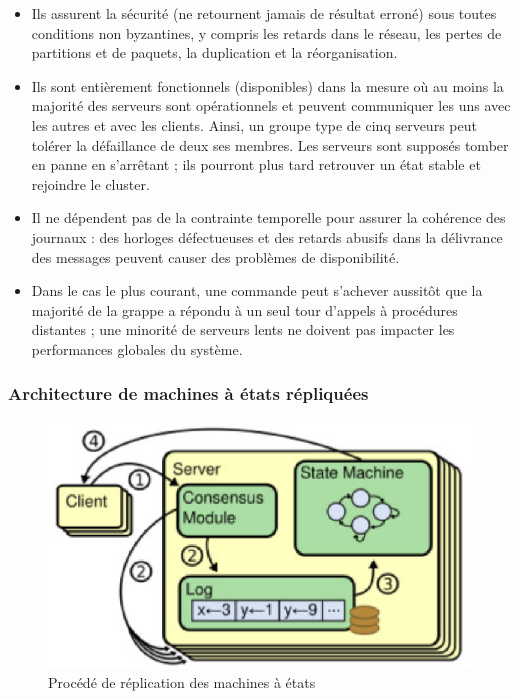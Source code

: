 \begin{itemize}
    \item Ils assurent la sécurité (ne retournent jamais de résultat erroné)
        sous toutes conditions non byzantines, y compris les retards dans le
        réseau, les pertes de partitions et de paquets, la duplication et
        la réorganisation.
    \item Ils sont entièrement fonctionnels (disponibles) dans la mesure où au
        moins la majorité des serveurs sont opérationnels et peuvent communiquer
        les uns avec les autres et avec les clients. Ainsi, un groupe type de
        cinq serveurs peut tolérer la défaillance de deux ses membres. Les
        serveurs sont supposés tomber en panne en s'arrêtant ; ils pourront plus
        tard retrouver un état stable et rejoindre le cluster.
    \item Il ne dépendent pas de la contrainte temporelle pour assurer la
        cohérence des journaux : des horloges défectueuses et des retards
        abusifs dans la délivrance des messages peuvent causer des problèmes de
        disponibilité. 
    \item Dans le cas le plus courant, une commande peut s'achever aussitôt que
        la majorité de la grappe a répondu à un seul tour d'appels à procédures
        distantes ; une minorité de serveurs lents ne doivent pas impacter les
        performances globales du système.
\end{itemize}

\subsubsection{Architecture de machines à états répliquées}

\begin{figure}[h]
    \centerline{\includegraphics[width=.37\textwidth]{img/replicated_state_machine}}
    \caption{Procédé de réplication des machines à états}
    \label{replicated_state_machine}
\end{figure}

